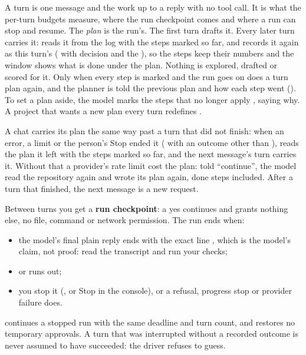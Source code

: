 A turn is one message and the work up to a reply with no tool call. It is
what the per-turn budgets measure, where the run checkpoint comes and where
a run can stop and resume. The \emph{plan} is the run's. The first turn
drafts it. Every later turn carries it:  reads it from the
log with the steps marked so far, and  records it again as
this turn's ( with decision  and the
), so the steps keep their numbers and the window shows what is
done under the plan. Nothing is explored, drafted or scored for it. Only
when every step is marked and the run goes on does a turn plan again, and
the planner is told the previous plan and how each step went
(). To set a plan aside, the model marks the steps
that no longer apply , saying why. A project that wants a new
plan every turn redefines .

A chat carries its plan the same way past a turn that did not finish: when
an error, a limit or the person's Stop ended it ( with an
outcome other than ),  reads the
plan it left with the steps marked so far, and the next message's turn
carries it. Without that a provider's rate limit cost the plan: told
``continue'', the model read the repository again and wrote its plan again,
done steps included. After a turn that finished, the next message is a new
request.

Between turns you get a \textbf{run checkpoint}: a yes continues and grants
nothing else, no file, command or network permission. The run ends when:

\begin{itemize}
  \item the model's final plain reply ends with the exact line
    , which is the model's claim, not proof: read
    the transcript and run your checks;
  \item {} or  runs out;
  \item you stop it (, or Stop in the console), or a
    refusal, progress stop or provider failure does.
\end{itemize}

 continues a stopped run with the same
deadline and turn count, and restores no temporary approvals. A turn that
was interrupted without a recorded outcome is never assumed to have
succeeded: the driver refuses to guess.

